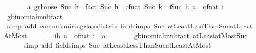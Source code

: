 \begin{isabellebody}
\ {\isachardoublequoteopen}{\isasymdots}\ {\isacharequal}{\kern0pt}\isanewline
\ \ \ \ {\isacharparenleft}{\kern0pt}{\isacharparenleft}{\kern0pt}a\ gchoose\ Suc\ h{\isacharparenright}{\kern0pt}\ {\isacharasterisk}{\kern0pt}\ {\isacharparenleft}{\kern0pt}fact\ {\isacharparenleft}{\kern0pt}Suc\ h{\isacharparenright}{\kern0pt}{\isacharparenright}{\kern0pt}\ {\isacharasterisk}{\kern0pt}\ of{\isacharunderscore}{\kern0pt}nat\ {\isacharparenleft}{\kern0pt}Suc\ k{\isacharparenright}{\kern0pt}{\isacharparenright}{\kern0pt}\ {\isacharplus}{\kern0pt}\ {\isacharparenleft}{\kern0pt}{\isasymProd}i{\isasymin}{\isacharbraceleft}{\kern0pt}{}{\isachardot}{\kern0pt}{\isachardot}{\kern0pt}Suc\ h{\isacharbraceright}{\kern0pt}{\isachardot}{\kern0pt}\ a\ {\isacharminus}{\kern0pt}\ of{\isacharunderscore}{\kern0pt}nat\ i{\isacharparenright}{\kern0pt}{\isachardoublequoteclose}\isanewline
\ \ \ \ \isamarkupfalse%
\ gbinomial{\isacharunderscore}{\kern0pt}mult{\isacharunderscore}{\kern0pt}fact{\isacharprime}{\kern0pt}\isanewline
\ \ \ \ \isamarkupfalse%
\ {\isacharparenleft}{\kern0pt}simp\ add{\isacharcolon}{\kern0pt}\ comm{\isacharunderscore}{\kern0pt}semiring{\isacharunderscore}{\kern0pt}class{\isachardot}{\kern0pt}distrib\ field{\isacharunderscore}{\kern0pt}simps\ Suc\ atLeastLessThanSuc{\isacharunderscore}{\kern0pt}atLeastAtMost{\isacharparenright}{\kern0pt}\isanewline
\ \ \isamarkupfalse%
\ \isamarkupfalse%
\ {\isachardoublequoteopen}{\isasymdots}\ {\isacharequal}{\kern0pt}\ {\isacharparenleft}{\kern0pt}{\isasymProd}i{\isasymin}{\isacharbraceleft}{\kern0pt}{}{\isachardot}{\kern0pt}{\isachardot}{\kern0pt}h{\isacharbraceright}{\kern0pt}{\isachardot}{\kern0pt}\ a\ {\isacharminus}{\kern0pt}\ of{\isacharunderscore}{\kern0pt}nat\ i{\isacharparenright}{\kern0pt}\ {\isacharasterisk}{\kern0pt}\ {\isacharparenleft}{\kern0pt}a\ {\isacharplus}{\kern0pt}\ {}{\isacharparenright}{\kern0pt}{\isachardoublequoteclose}\isanewline
\ \ \ \ \isamarkupfalse%
\ gbinomial{\isacharunderscore}{\kern0pt}mult{\isacharunderscore}{\kern0pt}fact{\isacharprime}{\kern0pt}\ atLeast{}{\isacharunderscore}{\kern0pt}atMost{\isacharunderscore}{\kern0pt}Suc\isanewline
\ \ \ \ \isamarkupfalse%
\ {\isacharparenleft}{\kern0pt}simp\ add{\isacharcolon}{\kern0pt}\ field{\isacharunderscore}{\kern0pt}simps\ Suc\ atLeastLessThanSuc{\isacharunderscore}{\kern0pt}atLeastAtMost{\isacharparenright}{\kern0pt}\isanewline
\ \ \isamarkupfalse%
\ \isamarkupfalse%

\end{isabellebody}

